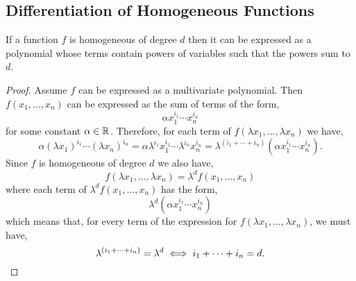 \documentclass[../MathsNotesBase.tex]{subfiles}
\begin{document}
{		
		\pagebreak
		\subsection{Differentiation of Homogeneous Functions}
		\bigskip
		\begin{lemma}\label{lem:homogeneous-func-has-powers-that-sum-to-degree}
			If a function $f$ is homogeneous of degree $d$ then it can be expressed as a polynomial whose terms contain powers of variables such that the powers sum to $d$.
		\end{lemma}
		\begin{proof}
			Assume $f$ can be expressed as a multivariate polynomial. Then $f(x_1, \dots, x_n)$ can be expressed as the sum of terms of the form,
			\[ \alpha x_1^{i_1} \cdots x_n^{i_n} \]
			for some constant ${ \alpha \in \mathbb{R}^{} }$. Therefore, for each term of $f(\lambda x_1, \dots, \lambda x_n)$ we have,
			\[ \alpha (\lambda x_1)^{i_1} \cdots (\lambda x_n)^{i_n} = \alpha \lambda^{i_1} x_1^{i_1} \cdots \lambda^{i_n} x_n^{i_n} = \lambda^{(i_1 + \cdots + i_n)} (\alpha x_1^{i_1} \cdots x_n^{i_n}). \]
			Since $f$ is homogeneous of degree $d$ we also have,
			\[ f(\lambda x_1, \dots, \lambda x_n) = \lambda^d f(x_1,\dots, x_n) \]
			where each term of $\lambda^d f(x_1,\dots, x_n)$ has the form,
			\[ \lambda^d (\alpha x_1^{i_1} \cdots x_n^{i_n}) \]
			which means that, for every term of the expression for $f(\lambda x_1, \dots, \lambda x_n)$, we must have,
			\[ \lambda^{(i_1 + \cdots + i_n)} = \lambda^d \iff i_1 + \cdots + i_n = d. \qedhere \]
		\end{proof}
		
}
\end{document}
